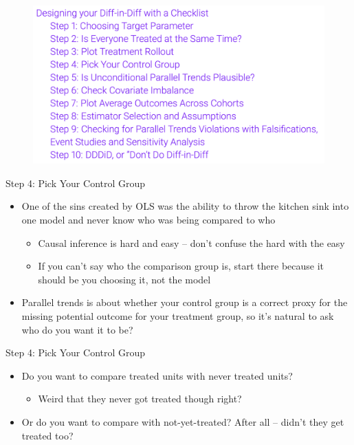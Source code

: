 \documentclass{beamer}
\begin{document}
\begin{frame}
 
\begin{figure}
    \centering
    \includegraphics[width=\textwidth]{./lecture_includes/checklist}
\end{figure}

\end{frame}


\begin{frame}{Step 4: Pick Your Control Group}

\begin{itemize}

\item One of the sins created by OLS was the ability to throw the kitchen sink into one model and never know who was being compared to who
	\begin{itemize}
	\item Causal inference is hard and easy -- don't confuse the hard with the easy
	\item If you can't say who the comparison group is, start there because it should be you choosing it, not the model
	\end{itemize}
\item Parallel trends is about whether your control group is a correct proxy for the missing potential outcome for your treatment group, so it's natural to ask who do you want it to be?
\end{itemize}

\end{frame}

\begin{frame}{Step 4: Pick Your Control Group}

\begin{itemize}

\item Do you want to compare treated units with never treated units?
	\begin{itemize}
	\item Weird that they never got treated though right?
	\end{itemize}
\item Or do you want to compare with not-yet-treated?  After all -- didn't they get treated too?
\end{itemize}

\end{frame}
\end{document}

